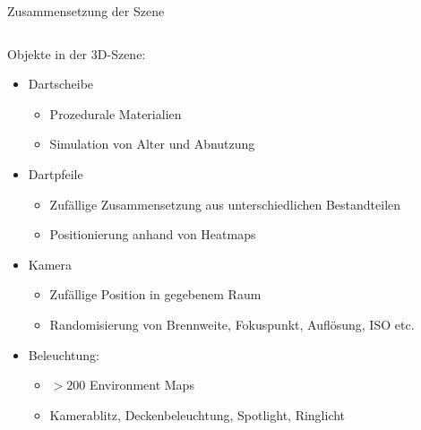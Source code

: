 
\begin{frame}{Zusammensetzung der Szene}
    \begin{columns}
        \begin{column}{0.6\linewidth}

            Objekte in der 3D-Szene:
            \begin{itemize}\footnotesize
                \setlength\itemsep{0em}
                \item<2-> Dartscheibe
                      \vspace*{-0.1cm}
                      \begin{itemize}\footnotesize
                          \item Prozedurale Materialien
                          \item Simulation von Alter und Abnutzung
                      \end{itemize}
                \item<3-> Dartpfeile
                      \vspace*{-0.1cm}
                      \begin{itemize}\footnotesize
                          \item Zufällige Zusammensetzung aus unterschiedlichen Bestandteilen
                          \item Positionierung anhand von Heatmaps
                      \end{itemize}
                \item<4-> Kamera
                      \vspace*{-0.1cm}
                      \begin{itemize}\footnotesize
                          \item Zufällige Position in gegebenem Raum
                          \item Randomisierung von Brennweite, Fokuspunkt, Auflösung, ISO etc.
                      \end{itemize}
                \item<5-> Beleuchtung:
                      \vspace*{-0.1cm}
                      \begin{itemize}\footnotesize
                          \item $>200$ Environment Maps
                          \item Kamerablitz, Deckenbeleuchtung, Spotlight, Ringlicht
                      \end{itemize}
            \end{itemize}


\end{column}
\end{columns}
\end{frame}
